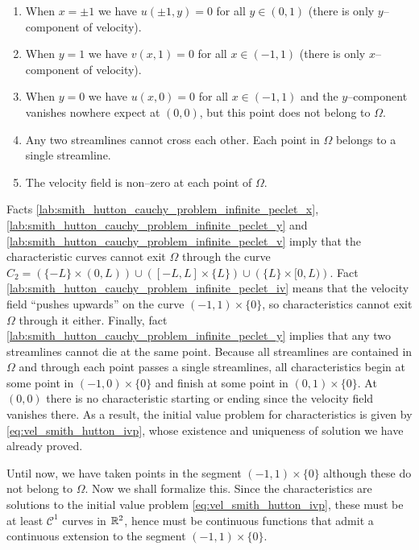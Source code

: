 \begin{enumerate}[label={(\roman*)}, topsep=0pt]
\label{lab:smith_hutton_cauchy_problem_infinite_peclet_i}
	\item When $x = \pm 1$ we have $u(\pm 1, y) = 0$ for all $y \in (0, 1)$
	(there is only $y$--component of velocity).
	\label{lab:smith_hutton_cauchy_problem_infinite_peclet_x}
	\item When $y = 1$ we have $v(x, 1) = 0$ for all $x \in (-1,1)$ (there is
	only $x$--component of velocity).
	\label{lab:smith_hutton_cauchy_problem_infinite_peclet_y}
	\item When $y = 0$ we have $u(x,0) = 0$ for all $x \in (-1,1)$ and the
	$y$--component vanishes nowhere expect at $(0,0)$, but this point does not
	belong to $\Omega$.
	\label{lab:smith_hutton_cauchy_problem_infinite_peclet_iv}
	\item Any two streamlines cannot cross each other. Each point in $\Omega$
	belongs to a single streamline.
	\label{lab:smith_hutton_cauchy_problem_infinite_peclet_v}
	\item The velocity field is non--zero at each point of $\Omega$.
\end{enumerate}
Facts \ref{lab:smith_hutton_cauchy_problem_infinite_peclet_x},
\ref{lab:smith_hutton_cauchy_problem_infinite_peclet_y} and
\ref{lab:smith_hutton_cauchy_problem_infinite_peclet_v} imply that the
characteristic curves cannot exit $\Omega$ through the curve
$C_2 = \left( \{ -L \} \times (0,L) \right) \cup \left( [-L,L] \times \{ L \}
\right) \cup \left( \{ L \} \times [0,L) \right)$. Fact
\ref{lab:smith_hutton_cauchy_problem_infinite_peclet_iv} means that the
velocity field ``pushes upwards'' on the curve $(-1,1) \times \{ 0 \}$, so
characteristics cannot exit $\Omega$ through it either. Finally, fact
\ref{lab:smith_hutton_cauchy_problem_infinite_peclet_y} implies that any two
streamlines cannot die at the same point. Because all streamlines are contained
in $\Omega$ and through each point passes a single streamlines, all
characteristics begin at some point in $(-1,0) \times \{ 0 \}$ and finish at
some point in $(0,1) \times \{ 0 \}$. At $(0,0)$ there is no characteristic
starting or ending since the velocity field vanishes there. As a result, the
initial value problem for characteristics is given by
\eqref{eq:vel_smith_hutton_ivp}, whose existence and uniqueness of solution
we have already proved. 

Until now, we have taken points in the segment $(-1,1) \times \{ 0 \}$ although
these do not belong to $\Omega$. Now we shall formalize this. Since the
characteristics are solutions to the initial value problem
\eqref{eq:vel_smith_hutton_ivp}, these must be at least $\mathcal{C}^1$
curves in $\mathbb{R}^2$, hence must be continuous functions that admit a continuous
extension to the segment $(-1,1) \times \{ 0 \}$.

